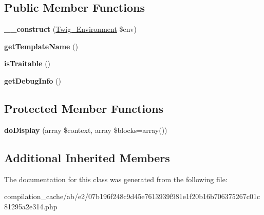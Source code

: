 \subsection*{Public Member Functions}
\begin{DoxyCompactItemize}
\item 
\hypertarget{class_____twig_template__abe207b196f248c9d45e7613939f981e1f20b16b706375267c01c81295a2e314_a4f8326243132c1450a81e0a817aa1be7}{}{\bfseries \+\_\+\+\_\+construct} (\hyperlink{class_twig___environment}{Twig\+\_\+\+Environment} \$env)\label{class_____twig_template__abe207b196f248c9d45e7613939f981e1f20b16b706375267c01c81295a2e314_a4f8326243132c1450a81e0a817aa1be7}

\item 
\hypertarget{class_____twig_template__abe207b196f248c9d45e7613939f981e1f20b16b706375267c01c81295a2e314_a621a3ccd148ed8b9e937da6959c98f39}{}{\bfseries get\+Template\+Name} ()\label{class_____twig_template__abe207b196f248c9d45e7613939f981e1f20b16b706375267c01c81295a2e314_a621a3ccd148ed8b9e937da6959c98f39}

\item 
\hypertarget{class_____twig_template__abe207b196f248c9d45e7613939f981e1f20b16b706375267c01c81295a2e314_aa9eb89be270f6afc256ef5e272b78a63}{}{\bfseries is\+Traitable} ()\label{class_____twig_template__abe207b196f248c9d45e7613939f981e1f20b16b706375267c01c81295a2e314_aa9eb89be270f6afc256ef5e272b78a63}

\item 
\hypertarget{class_____twig_template__abe207b196f248c9d45e7613939f981e1f20b16b706375267c01c81295a2e314_abd0ecb0136f4228db2bd963bfc1e20d7}{}{\bfseries get\+Debug\+Info} ()\label{class_____twig_template__abe207b196f248c9d45e7613939f981e1f20b16b706375267c01c81295a2e314_abd0ecb0136f4228db2bd963bfc1e20d7}

\end{DoxyCompactItemize}
\subsection*{Protected Member Functions}
\begin{DoxyCompactItemize}
\item 
\hypertarget{class_____twig_template__abe207b196f248c9d45e7613939f981e1f20b16b706375267c01c81295a2e314_adb62b7c226e07d30f836ed16158d924f}{}{\bfseries do\+Display} (array \$context, array \$blocks=array())\label{class_____twig_template__abe207b196f248c9d45e7613939f981e1f20b16b706375267c01c81295a2e314_adb62b7c226e07d30f836ed16158d924f}

\end{DoxyCompactItemize}
\subsection*{Additional Inherited Members}


The documentation for this class was generated from the following file\+:\begin{DoxyCompactItemize}
\item 
compilation\+\_\+cache/ab/e2/07b196f248c9d45e7613939f981e1f20b16b706375267c01c81295a2e314.\+php\end{DoxyCompactItemize}
